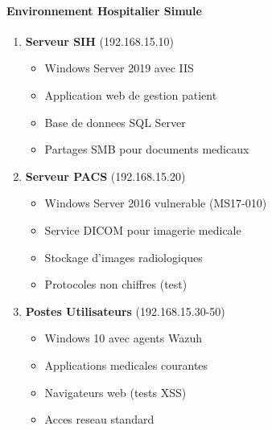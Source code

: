 \paragraph{Environnement Hospitalier Simule}
\begin{enumerate}
    \item \textbf{Serveur SIH} (192.168.15.10)
          \begin{itemize}
              \item Windows Server 2019 avec IIS
              \item Application web de gestion patient
              \item Base de donnees SQL Server
              \item Partages SMB pour documents medicaux
          \end{itemize}

    \item \textbf{Serveur PACS} (192.168.15.20)
          \begin{itemize}
              \item Windows Server 2016 vulnerable (MS17-010)
              \item Service DICOM pour imagerie medicale
              \item Stockage d'images radiologiques
              \item Protocoles non chiffres (test)
          \end{itemize}

    \item \textbf{Postes Utilisateurs} (192.168.15.30-50)
          \begin{itemize}
              \item Windows 10 avec agents Wazuh
              \item Applications medicales courantes
              \item Navigateurs web (tests XSS)
              \item Acces reseau standard
          \end{itemize}
\end{enumerate}

